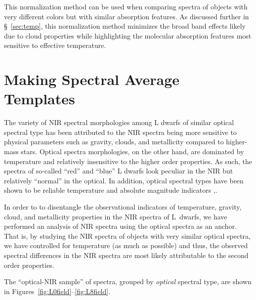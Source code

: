 \documentclass[12pt,preprint]{aastex}
\newcommand{\sample}{180}
\begin{document}
This normalization method can be used when comparing spectra of objects with very different colors but with similar absorption features. As discussed further in \S~\ref{sec:temp}, this normalization method minimizes the broad band effects likely due to cloud properties while highlighting the molecular absorption features most sensitive to effective temperature. 

\section{Making Spectral Average Templates}
\label{sec:templates}

The variety of NIR spectral morphologies among L dwarfs of similar optical spectral type has been attributed to the NIR spectra being more sensitive to physical parameters such as gravity, clouds, and metallicity compared to higher-mass stars.
Optical spectra morphologies, on the other hand, are dominated by temperature and relatively insensitive to the higher order properties. As such, the spectra of so-called ``red'' and ``blue'' L dwarfs look peculiar in the NIR but relatively ``normal'' in the optical. 
In addition, optical spectral types have been shown to be reliable temperature and absolute magnitude indicators \cite[Figure 7 and 9]{Kirkpatrick05},\cite{Faherty:2012cy}. 

In order to to disentangle the observational indicators of temperature, gravity, cloud, and metallicity properties in the NIR spectra of L~dwarfs, we have performed an analysis of NIR spectra using the optical spectra as an anchor.
That is, by studying the NIR spectra of objects with very similar optical spectra, we have controlled for temperature (as much as possible) and thus, the observed spectral differences in the NIR spectra are most likely attributable to the second order properties.

The ``optical-NIR sample'' of spectra, grouped by \emph{optical} spectral type, are shown in Figures~\ref{fig:L0field}--\ref{fig:L8field}. 
\end{document}
